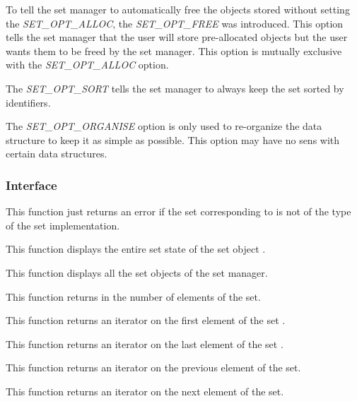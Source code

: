 To tell the set manager to automatically free the objects stored without
setting the \textit{SET\_OPT\_ALLOC}, the \textit{SET\_OPT\_FREE} was
introduced. This option tells the set manager that the user will store
pre-allocated objects but the user wants them to be freed by the set
manager. This option is mutually exclusive with the
\textit{SET\_OPT\_ALLOC} option.

The \textit{SET\_OPT\_SORT} tells the set manager to always keep the set
sorted by identifiers.

The \textit{SET\_OPT\_ORGANISE} option is only used to re-organize the data
structure to keep it as simple as possible. This option may have no sens
with certain data structures.

%
%

\subsubsection{Interface}

	 {
	   This function just returns an error if the set corresponding
	   to  is not of the type of the set implementation.
	 }

	 {
	   This function displays the entire set state of the set object
	   .
	 }

	 {
	   This function displays all the set objects of the set manager.
	 }

	 {
	   This function returns in  the number of elements
	   of the set.
	 }

	 {
	   This function returns an iterator on the first element
	   of the set .
	 }

	 {
	   This function returns an iterator on the last element of
	   the set .
	 }

	 {
	   This function returns an iterator on the previous element
	   of the set.
	 }

	 {
	   This function returns an iterator on the next element
	   of the set.
	 }

